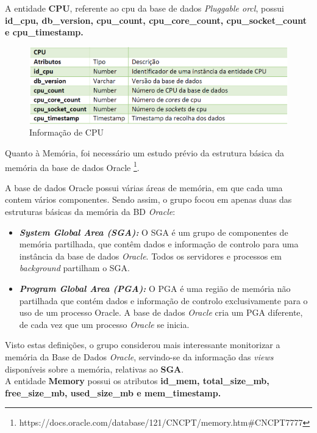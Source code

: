 \documentclass[a4paper]{article}
\begin{document}
A entidade \textbf{CPU}, referente ao cpu da base de dados \emph{Pluggable orcl}, possui \textbf{id\_cpu, db\_version, cpu\_count, cpu\_core\_count, cpu\_socket\_count e cpu\_timestamp.}

\begin{figure}[H]
\centering
\includegraphics[scale=0.65]{cpu.PNG}
\caption{Informação de CPU}
\end{figure}

Quanto à Memória, foi necessário um estudo prévio da estrutura básica da memória da base de dados Oracle \footnote{https://docs.oracle.com/database/121/CNCPT/memory.htm#CNCPT7777}.

A base de dados Oracle possui várias áreas de memória, em que cada uma contem vários componentes. Sendo assim, o grupo focou em apenas duas das estruturas básicas da memória da BD \emph{Oracle}:

\begin{itemize}
    \item \emph{\textbf{System Global Area (SGA):}} O SGA é um grupo de componentes de memória partilhada, que contêm dados e informação de controlo para uma instância da base de dados \emph{Oracle}. Todos os servidores e processos em \emph{background} partilham o SGA. 
    
    \item \emph{\textbf{Program Global Area (PGA):}} O PGA é uma região de memória não partilhada que contém dados e informação de controlo exclusivamente para o uso de um processo Oracle. A base de dados \emph{Oracle} cria um PGA diferente, de cada vez que um processo \emph{Oracle} se inicia.
\end{itemize}

Visto estas definições, o grupo considerou mais interessante monitorizar a memória da Base de Dados \emph{Oracle}, servindo-se da informação das \emph{views} disponíveis sobre a memória, relativas ao \textbf{SGA}.\\

A entidade \textbf{Memory} possui os atributos \textbf{id\_mem, total\_size\_mb, free\_size\_mb, used\_size\_mb e mem\_timestamp.}
\end{document}

